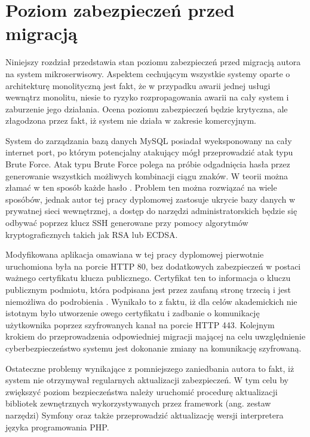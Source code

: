 \documentclass[12pt,twoside]{book}
\begin{document}
\section{Poziom zabezpieczeń przed migracją}
Niniejszy rozdział przedstawia stan poziomu zabezpieczeń przed migracją autora na system mikroserwisowy. Aspektem cechującym wszystkie systemy oparte o architekturę monolityczną jest fakt, że w przypadku awarii jednej usługi wewnątrz monolitu, niesie to ryzyko rozpropagowania awarii na cały system i zaburzenie jego działania. Ocena poziomu zabezpieczeń będzie krytyczna, ale złagodzona przez fakt, iż system nie działa w zakresie komercyjnym.

System do zarządzania bazą danych MySQL posiadał wyeksponowany na cały internet port, po którym potencjalny atakujący mógł przeprowadzić atak typu Brute Force. Atak typu Brute Force polega na próbie odgadnięcia hasła przez generowanie wszystkich możliwych kombinacji ciągu znaków. W teorii można złamać w ten sposób każde hasło \cite{brute.forcre}. Problem ten można rozwiązać na wiele sposóbów, jednak autor tej pracy dyplomowej zastosuje ukrycie bazy danych w prywatnej sieci wewnętrznej, a dostęp do narzędzi administratorskich będzie się odbywać poprzez klucz SSH generowane przy pomocy algorytmów kryptograficznych takich jak RSA lub ECDSA.

Modyfikowana aplikacja omawiana w tej pracy dyplomowej pierwotnie uruchomiona była na porcie HTTP 80, bez dodatkowych zabezpieczeń w postaci ważnego certyfikatu klucza publicznego. Certyfikat ten to informacja o kluczu publicznym podmiotu, która podpisana jest przez zaufaną stronę trzecią i jest niemożliwa do podrobienia \cite{pkn.ssl}. Wynikało to z faktu, iż dla celów akademickich nie istotnym było utworzenie owego certyfikatu i zadbanie o komunikację użytkownika poprzez szyfrowanych kanał na porcie HTTP 443. Kolejnym krokiem do przeprowadzenia odpowiedniej migracji mającej na celu uwzględnienie cyberbezpieczeństwo systemu jest dokonanie zmiany na komunikację szyfrowaną.

Ostateczne problemy wynikające z pomniejszego zaniedbania autora to fakt, iż system nie otrzymywał regularnych aktualizacji zabezpieczeń. W tym celu by zwiększyć poziom bezpieczeństwa należy uruchomić procedurę aktualizacji bibliotek zewnętrznych wykorzystywanych przez framework (ang. zestaw narzędzi) Symfony oraz także przeprowadzić aktualizację wersji interpretera języka programowania PHP.



\listoffigures
\end{document}
